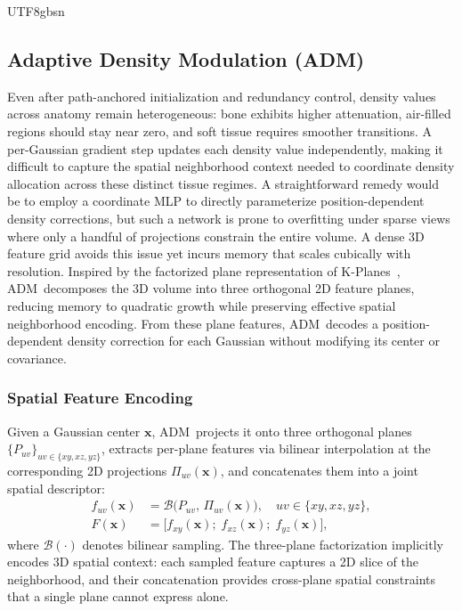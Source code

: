 \documentclass{egpubl}
\newcommand{\adm}{ADM}
\begin{document}
\begin{CJK*}{UTF8}{gbsn}
\subsection{Adaptive Density Modulation (\adm)}
\label{sec:adm}

Even after path-anchored initialization and redundancy control, density values across anatomy remain heterogeneous: bone exhibits higher attenuation, air-filled regions should stay near zero, and soft tissue requires smoother transitions. A per-Gaussian gradient step updates each density value independently, making it difficult to capture the spatial neighborhood context needed to coordinate density allocation across these distinct tissue regimes. A straightforward remedy would be to employ a coordinate MLP to directly parameterize position-dependent density corrections, but such a network is prone to overfitting under sparse views where only a handful of projections constrain the entire volume. A dense 3D feature grid avoids this issue yet incurs memory that scales cubically with resolution. Inspired by the factorized plane representation of K-Planes~\cite{fridovich2022kplanes}, \adm\ decomposes the 3D volume into three orthogonal 2D feature planes, reducing memory to quadratic growth while preserving effective spatial neighborhood encoding. From these plane features, \adm\ decodes a position-dependent density correction for each Gaussian without modifying its center or covariance.

\subsubsection{Spatial Feature Encoding}
Given a Gaussian center $\mathbf{x}$, \adm\ projects it onto three orthogonal planes $\{P_{uv}\}_{uv\in\{xy,xz,yz\}}$, extracts per-plane features via bilinear interpolation at the corresponding 2D projections $\Pi_{uv}(\mathbf{x})$, and concatenates them into a joint spatial descriptor:
\begin{align}
f_{uv}(\mathbf{x}) &= \mathcal{B}\!\big(P_{uv},\,\Pi_{uv}(\mathbf{x})\big), \quad uv\in\{xy,xz,yz\}, \label{eq:adm-plane}\\
F(\mathbf{x}) &= \big[f_{xy}(\mathbf{x});\; f_{xz}(\mathbf{x});\; f_{yz}(\mathbf{x})\big],
\label{eq:adm-feature}
\end{align}
where $\mathcal{B}(\cdot)$ denotes bilinear sampling. The three-plane factorization implicitly encodes 3D spatial context: each sampled feature captures a 2D slice of the neighborhood, and their concatenation provides cross-plane spatial constraints that a single plane cannot express alone.


\end{CJK*}
\end{document}
